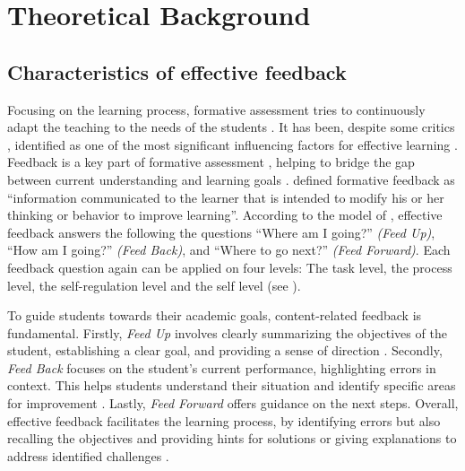 \section{Theoretical Background}


\subsection{Characteristics of effective feedback} \label{sec:Characteristics_feedback}

Focusing on the learning process, formative assessment tries to continuously adapt the teaching to the needs of the students \citep{filsecker2012repositioning}. It has been, despite some critics \citep{bennett2010cognitively}, identified as one of the most significant influencing factors for effective learning \citep{hattie2008visible}. 
Feedback is a key part of formative assessment \citep{brookhart2008feedback}, helping to bridge the gap between current understanding and learning goals \citep{sadler1989formative}. \citet{shute2008focus} defined formative feedback as ``information communicated to the learner that is intended to modify his or her thinking or behavior to improve learning''. According to the model of \cite{hattie2007power}, effective feedback answers the following the questions ``Where am I going?'' \textit{(Feed Up)}, ``How am I going?''  \textit{(Feed Back)}, and ``Where to go next?''  \textit{(Feed Forward)}. Each feedback question again can be applied on four levels: The task level, the process level, the self-regulation level and the self level (see \cite{hattie2007power}).

To guide students towards their academic goals, content-related feedback is fundamental. Firstly, \textit{Feed Up} involves clearly summarizing the objectives of the student, establishing a clear goal, and providing a sense of direction \citep{hattie2007power}. 
Secondly, \textit{Feed Back} focuses on the student's current performance, highlighting errors in context. This helps students understand their situation and identify specific areas for improvement \citep{hattie2007power}.
Lastly, \textit{Feed Forward} offers guidance on the next steps. Overall, effective feedback facilitates the learning process, by identifying errors but also recalling the objectives and providing hints for solutions or giving explanations to address identified challenges \citep{hattie2007power, ossenberg2019attributes}.

